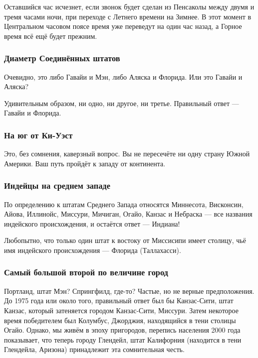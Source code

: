 Оставшийся час исчезнет, если звонок будет сделан из Пенсаколы между двумя и тремя часами ночи, при переходе с Летнего времени на Зимнее.
В этот момент в Центральном часовом поясе время уже переведут на один час назад, а Горное время всё ещё будет прежним.\heart 

       
                                  
\subsubsection*{Диаметр Соединённых штатов}%

Очевидно, это либо Гавайи и Мэн, либо Аляска и Флорида.
Или это Гавайи и Аляска?

\medskip

Удивительным образом, ни одно, ни другое, ни третье.
Правильный ответ --- Гавайи и Флорида.\heart

\subsubsection*{На юг от Ки-Уэст}%

Это, без сомнения, каверзный вопрос. %
Вы не пересечёте ни одну страну Южной Америки.
Ваш путь пройдёт к западу от континента.
\heart

\subsubsection*{Индейцы на среднем западе}%

По определению к штатам Среднего Запада относятся Миннесота, Висконсин, Айова,
Иллинойс, Миссури, Мичиган, Огайо, Канзас и Небраска --- все названия индейского
происхождения, и остаётся ответ --- Индиана!\heart

Любопытно, что только один штат к востоку от Миссисипи имеет столицу, чьё имя индейского происхождения --- Флорида (Таллахасси).

\subsubsection*{Самый большой второй по величине город}%

Портланд, штат Мэн? Спрингфилд, где-то? 
Частые, но не верные предположения.
До 1975 года или около того, правильный ответ был бы Канзас-Сити, штат Канзас, который затеняется городом Канзас-Сити, Миссури.
Затем некоторое время победителем был Колумбус, Джорджия, находящийся в тени столицы Огайо.
Однако, мы живём в эпоху пригородов, %
перепись населения 2000 года показывает, что теперь городу Глендейл, штат Калифорния (находится в тени Глендейла, Аризона) принадлежит эта сомнительная %
честь.\heart

